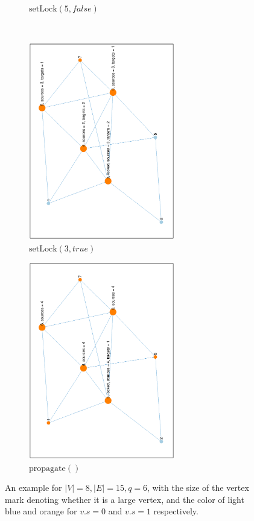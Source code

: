 \documentclass[12pt]{report}
\begin{document}
\begin{figure}[H]
\begin{subfigure}{0.45\textwidth}
	\caption{$ \mathrm{setLock}(5, \mathit{false}) $}
\end{subfigure}
\\
\begin{subfigure}{0.45\textwidth}
	\includegraphics[width=0.7\textwidth,angle=-90]{graph/example/4.eps}
	\caption{$ \mathrm{setLock}(3, \mathit{true}) $}
\end{subfigure}
\begin{subfigure}{0.45\textwidth}
	\includegraphics[width=0.7\textwidth,angle=-90]{graph/example/5.eps}
	\caption{$ \mathrm{propagate}() $}
\end{subfigure}

\caption{An example for $ \lvert V \rvert = 8, \lvert E \rvert = 15, q = 6 $,
         with the size of the vertex mark denoting whether it is a large vertex,
         and the color of light blue and orange for $ v.s = 0 $ and $ v.s = 1 $ respectively.}
\end{figure}
\end{document}
